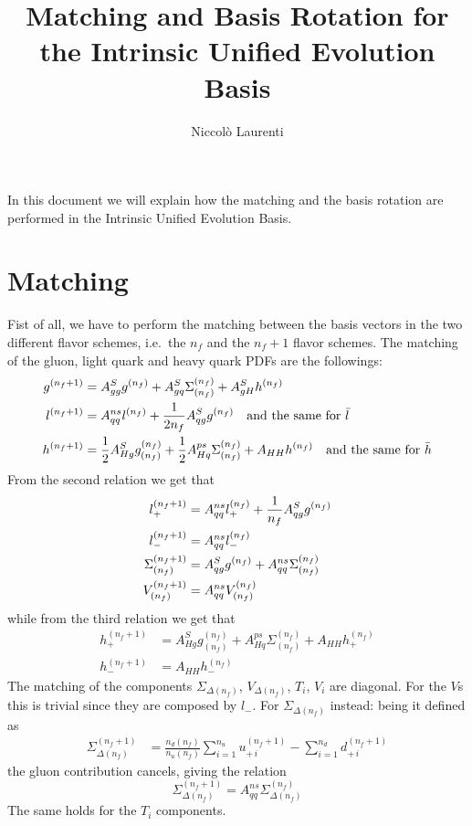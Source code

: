 \documentclass[a4paper,oneside]{article}
\title{Matching and Basis Rotation for the Intrinsic Unified Evolution Basis}
\author{Niccolò Laurenti}
\date{}
\begin{document}
\maketitle

In this document we will explain how the matching and the basis rotation are performed in the Intrinsic Unified Evolution Basis.

\section{Matching}
Fist of all, we have to perform the matching between the basis vectors in the two different flavor schemes, i.e.\ the $n_f$ and the $n_f+1$ flavor schemes. The matching of the gluon, light quark and heavy quark PDFs are the followings:
\begin{align*}
g^{(n_f+1)}&=A^S_{gg}g^{(n_f)}+A^S_{gq}\Sigma^{(n_f)}_{(n_f)}+A^S_{gH}h^{(n_f)} \\
l^{(n_f+1)} &= A^{ns}_{qq} l^{(n_f)} + {1\over2n_f} A^S_{qg}g^{(n_f)} \quad \text{and the same for $\bar{l}$}\\
h^{(n_f+1)} &= {1\over2} A^{S}_{Hg} g^{(n_f)}_{(n_f)}+ {1\over2} A^{ps}_{Hq} \Sigma^{(n_f)}_{(n_f)} + A_{HH}h^{(n_f)} \quad \text{and the same for $\bar{h}$}
\end{align*}
From the second relation we get that
\begin{align*}
l^{(n_f+1)}_+ &= A^{ns}_{qq} l^{(n_f)}_+ + {1\over n_f} A^S_{qg}g^{(n_f)} \\
l^{(n_f+1)}_- &= A^{ns}_{qq} l^{(n_f)}_- \\
\Sigma^{(n_f+1)}_{(n_f)}&=A^S_{qg}g^{(n_f)}+A^{ns}_{qq}\Sigma^{(n_f)}_{(n_f)} \\
V^{(n_f+1)}_{(n_f)}&=A^{ns}_{qq}V^{(n_f)}_{(n_f)}
\end{align*}
while from the third relation we get that
\begin{align*}
h^{(n_f+1)}_+ &= A^{S}_{Hg} g^{(n_f)}_{(n_f)}+A^{ps}_{Hq} \Sigma^{(n_f)}_{(n_f)} + A_{HH}h^{(n_f)}_+ \\
h^{(n_f+1)}_- &= A_{HH}h^{(n_f)}_-
\end{align*}
 The matching of the components $\Sigma_{\Delta(n_f)}$, $V_{\Delta(n_f)}$, $T_i$, $V_i$ are diagonal. For the $V$s this is trivial since they are composed by $l_-$. For $\Sigma_{\Delta(n_f)}$ instead: being it defined as
 \begin{align*}
 \Sigma^{(n_f+1)}_{\Delta(n_f)} & = \frac{n_d(n_f)}{n_u(n_f)} \sum_{i=1}^{n_u} u_{+\,i}^{(n_f+1)} - \sum_{i=1}^{n_d} d_{+\,i}^{(n_f+1)}
 \end{align*}
 the gluon contribution cancels, giving the relation
 \begin{equation*}
 \Sigma^{(n_f+1)}_{\Delta(n_f)}=A^{ns}_{qq}\Sigma^{(n_f)}_{\Delta(n_f)}
\end{equation*}
The same holds for the $T_i$ components.
\end{document}
